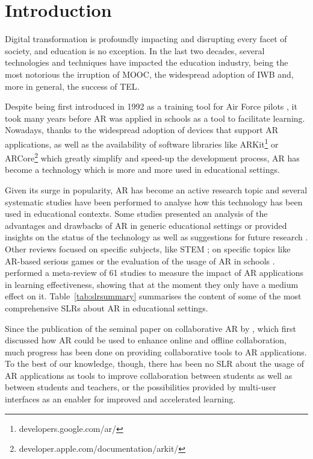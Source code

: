 \section{Introduction} \label{sec:introduction}
Digital transformation is profoundly impacting and disrupting every facet of society, and education is no exception. In the last two decades, several technologies and techniques have impacted the education industry, being the most notorious the irruption of \gls{MOOC}, the widespread adoption of \gls{IWB} and, more in general, the success of \gls{TEL}. 

Despite being first introduced in 1992 as a training tool for Air Force pilots \citep{caudell1992augmented}, it took many years before \gls{AR} was applied in schools as a tool to facilitate learning. Nowadays, thanks to the widespread adoption of devices that support \gls{AR} applications, as well as the availability of software libraries like ARKit\footnote{developers.google.com/ar/}
or ARCore\footnote{developer.apple.com/documentation/arkit/} which greatly simplify and speed-up the development process, \gls{AR} has become a technology which is more and more used in educational settings.

Given its surge in popularity, \gls{AR} has become an active research topic and several systematic studies have been performed to analyse how this technology has been used in educational contexts. Some studies presented an analysis of the advantages and drawbacks of \gls{AR} in generic educational settings \citep{akccayir2017advantages, radu2014augmented, diegmann2015benefits} or provided insights on the status of the technology as well as suggestions for future research \citep{cheng2013affordances, arici2019research, bacca2014augmented, pellas2019augmenting}. Other reviews focused on specific subjects, like \gls{STEM} \citep{ibanez2018augmented, nielsen2016augmented}; on specific topics like \gls{AR}-based serious games \citep{li2017augmented, bartolome2011can, laine2018mobile} or the evaluation of the usage of \gls{AR} in schools \citep{da2019perspectives, chen2017review}. \citet{garzon2019systematic} performed a meta-review of 61 studies to measure the impact of \gls{AR} applications in learning effectiveness, showing that at the moment they only have a medium effect on it. Table~\ref{tab:slrsummary} summarises the content of some of the most comprehensive \glspl{SLR} about \gls{AR} in educational settings.

Since the publication of the seminal paper on collaborative \gls{AR} by \citet{billinghurst2002collaborative}, which first discussed how AR could be used to enhance online and offline collaboration, much progress has been done on providing collaborative tools to \gls{AR} applications. To the best of our knowledge, though, there has been no \gls{SLR} about the usage of \gls{AR} applications as tools to improve collaboration between students as well as between students and teachers, or the possibilities provided by multi-user interfaces as an enabler for improved and accelerated learning. 

